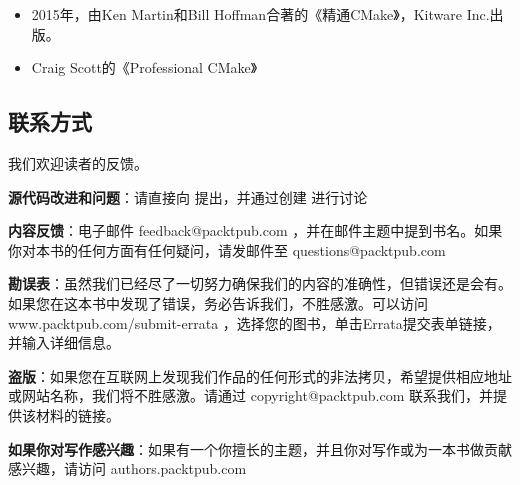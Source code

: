 \begin{itemize}
\item 2015年，由Ken Martin和Bill Hoffman合著的《精通CMake》，Kitware Inc.出版。

\item Craig Scott的《Professional CMake》 

\end{itemize}

\subsection{联系方式}

我们欢迎读者的反馈。

\textbf{源代码改进和问题}：请直接向  提出，并通过创建  进行讨论

\textbf{内容反馈}：电子邮件 feedback@packtpub.com ，并在邮件主题中提到书名。如果你对本书的任何方面有任何疑问，请发邮件至 questions@packtpub.com

\textbf{勘误表}：虽然我们已经尽了一切努力确保我们的内容的准确性，但错误还是会有。如果您在这本书中发现了错误，务必告诉我们，不胜感激。可以访问 www.packtpub.com/submit-errata ，选择您的图书，单击Errata提交表单链接，并输入详细信息。

\textbf{盗版}：如果您在互联网上发现我们作品的任何形式的非法拷贝，希望提供相应地址或网站名称，我们将不胜感激。请通过 copyright@packtpub.com 联系我们，并提供该材料的链接。

\textbf{如果你对写作感兴趣}：如果有一个你擅长的主题，并且你对写作或为一本书做贡献感兴趣，请访问 authors.packtpub.com

